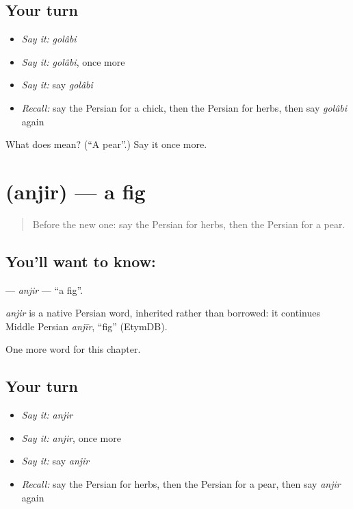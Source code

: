 \subsection*{Your turn}
\begin{itemize}
\raggedright
  \item \emph{Say it:} \emph{golâbi}
  \item \emph{Say it:} \emph{golâbi}, once more
  \item \emph{Say it:} say \emph{golâbi}
  \item \emph{Recall:} say the Persian for a chick, then the Persian for herbs, then say \emph{golâbi} again
\end{itemize}

\begin{tcolorbox}[breakable,colback=teal!4,colframe=teal!35!black,title={Before you move on}]
What does  mean? (\textquotedblleft{}A pear\textquotedblright{}.) Say it once more.
\end{tcolorbox}
\section[\texorpdfstring{\fa{انجیر} (anjir)}{انجیر (anjir)}]{ (anjir) — a fig}

\label{lesson:FA-C241-anjir}



\begin{quote}
Before the new one: say the Persian for herbs, then the Persian for a pear.
\end{quote}

\subsection*{You'll want to know: }
\textbf{} — \emph{anjir} — \textquotedblleft{}a fig\textquotedblright{}.

\begin{cousinweb}
\emph{anjir} is a native Persian word, inherited rather than borrowed: it continues Middle Persian \emph{anjīr}, \textquotedblleft{}fig\textquotedblright{} (EtymDB).
\end{cousinweb}

\begin{grammarlens}[title={What you've built}]
One more word for this chapter.
\end{grammarlens}

\subsection*{Your turn}
\begin{itemize}
\raggedright
  \item \emph{Say it:} \emph{anjir}
  \item \emph{Say it:} \emph{anjir}, once more
  \item \emph{Say it:} say \emph{anjir}
  \item \emph{Recall:} say the Persian for herbs, then the Persian for a pear, then say \emph{anjir} again
\end{itemize}

